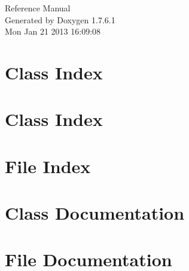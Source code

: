 \documentclass[a4paper]{book}
\begin{document}
\hypersetup{pageanchor=false,citecolor=blue}
\begin{titlepage}
\vspace*{7cm}
\begin{center}
{\Large \-Reference \-Manual}\\
\vspace*{1cm}
{\large \-Generated by Doxygen 1.7.6.1}\\
\vspace*{0.5cm}
{\small Mon Jan 21 2013 16:09:08}\\
\end{center}
\end{titlepage}
\clearemptydoublepage
{}
\tableofcontents
\clearemptydoublepage
{}
\hypersetup{pageanchor=true,citecolor=blue}
\chapter{\-Class \-Index}

\chapter{\-Class \-Index}

\chapter{\-File \-Index}

\chapter{\-Class \-Documentation}

















\chapter{\-File \-Documentation}


















\printindex
\end{document}
